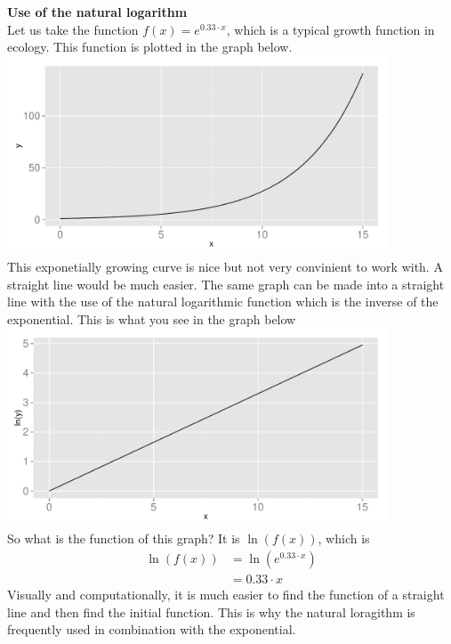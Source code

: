 \documentclass[a4paper]{report}
\begin{document}
\begin{mdframed}
\textbf{Use of the natural logarithm}\\
Let us take the function $f(x)= e^{0.33\cdot x}$, which is a typical growth function in ecology. This function is plotted in the graph below.\\
\includegraphics[width=0.85\textwidth]{example_e_plot.pdf}\\
This exponetially growing curve is nice but not very convinient to work with. A straight line would be much easier. The same graph can be made into a straight line with the use of the natural logarithmic function which is the inverse of the exponential. This is what you see in the graph below\\
\includegraphics[width=0.85\textwidth]{example_ln_plot.pdf}\\
So what is the function of this graph? It is $\ln(f(x))$, which is
\begin{equation}
\begin{aligned}
\ln(f(x))&=\ln(e^{0.33\cdot x})\\
&=0.33\cdot x 
\end{aligned}
\end{equation}
Visually and computationally,  it is much easier to find the function of a straight line and then find the initial function. This is why the natural loragithm is frequently used in combination with the exponential. 
\end{mdframed}
\end{document}
